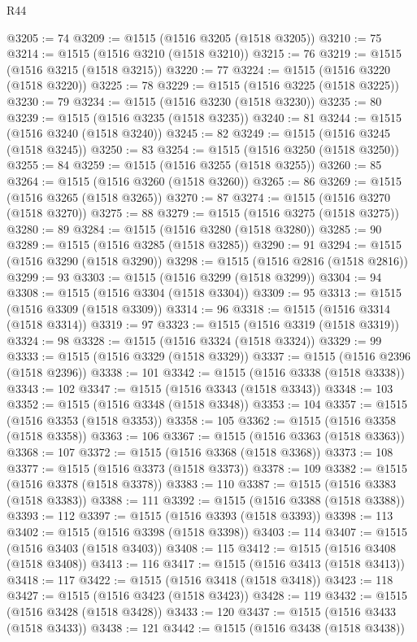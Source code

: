 \begin{lexlean}{R44}
\begin{coremodule}
{@3205 := 74
@3209 := @1515 (@1516 @3205 (@1518 @3205))
@3210 := 75
@3214 := @1515 (@1516 @3210 (@1518 @3210))
@3215 := 76
@3219 := @1515 (@1516 @3215 (@1518 @3215))
@3220 := 77
@3224 := @1515 (@1516 @3220 (@1518 @3220))
@3225 := 78
@3229 := @1515 (@1516 @3225 (@1518 @3225))
@3230 := 79
@3234 := @1515 (@1516 @3230 (@1518 @3230))
@3235 := 80
@3239 := @1515 (@1516 @3235 (@1518 @3235))
@3240 := 81
@3244 := @1515 (@1516 @3240 (@1518 @3240))
@3245 := 82
@3249 := @1515 (@1516 @3245 (@1518 @3245))
@3250 := 83
@3254 := @1515 (@1516 @3250 (@1518 @3250))
@3255 := 84
@3259 := @1515 (@1516 @3255 (@1518 @3255))
@3260 := 85
@3264 := @1515 (@1516 @3260 (@1518 @3260))
@3265 := 86
@3269 := @1515 (@1516 @3265 (@1518 @3265))
@3270 := 87
@3274 := @1515 (@1516 @3270 (@1518 @3270))
@3275 := 88
@3279 := @1515 (@1516 @3275 (@1518 @3275))
@3280 := 89
@3284 := @1515 (@1516 @3280 (@1518 @3280))
@3285 := 90
@3289 := @1515 (@1516 @3285 (@1518 @3285))
@3290 := 91
@3294 := @1515 (@1516 @3290 (@1518 @3290))
@3298 := @1515 (@1516 @2816 (@1518 @2816))
@3299 := 93
@3303 := @1515 (@1516 @3299 (@1518 @3299))
@3304 := 94
@3308 := @1515 (@1516 @3304 (@1518 @3304))
@3309 := 95
@3313 := @1515 (@1516 @3309 (@1518 @3309))
@3314 := 96
@3318 := @1515 (@1516 @3314 (@1518 @3314))
@3319 := 97
@3323 := @1515 (@1516 @3319 (@1518 @3319))
@3324 := 98
@3328 := @1515 (@1516 @3324 (@1518 @3324))
@3329 := 99
@3333 := @1515 (@1516 @3329 (@1518 @3329))
@3337 := @1515 (@1516 @2396 (@1518 @2396))
@3338 := 101
@3342 := @1515 (@1516 @3338 (@1518 @3338))
@3343 := 102
@3347 := @1515 (@1516 @3343 (@1518 @3343))
@3348 := 103
@3352 := @1515 (@1516 @3348 (@1518 @3348))
@3353 := 104
@3357 := @1515 (@1516 @3353 (@1518 @3353))
@3358 := 105
@3362 := @1515 (@1516 @3358 (@1518 @3358))
@3363 := 106
@3367 := @1515 (@1516 @3363 (@1518 @3363))
@3368 := 107
@3372 := @1515 (@1516 @3368 (@1518 @3368))
@3373 := 108
@3377 := @1515 (@1516 @3373 (@1518 @3373))
@3378 := 109
@3382 := @1515 (@1516 @3378 (@1518 @3378))
@3383 := 110
@3387 := @1515 (@1516 @3383 (@1518 @3383))
@3388 := 111
@3392 := @1515 (@1516 @3388 (@1518 @3388))
@3393 := 112
@3397 := @1515 (@1516 @3393 (@1518 @3393))
@3398 := 113
@3402 := @1515 (@1516 @3398 (@1518 @3398))
@3403 := 114
@3407 := @1515 (@1516 @3403 (@1518 @3403))
@3408 := 115
@3412 := @1515 (@1516 @3408 (@1518 @3408))
@3413 := 116
@3417 := @1515 (@1516 @3413 (@1518 @3413))
@3418 := 117
@3422 := @1515 (@1516 @3418 (@1518 @3418))
@3423 := 118
@3427 := @1515 (@1516 @3423 (@1518 @3423))
@3428 := 119
@3432 := @1515 (@1516 @3428 (@1518 @3428))
@3433 := 120
@3437 := @1515 (@1516 @3433 (@1518 @3433))
@3438 := 121
@3442 := @1515 (@1516 @3438 (@1518 @3438))
}
\end{coremodule}
\end{lexlean}
